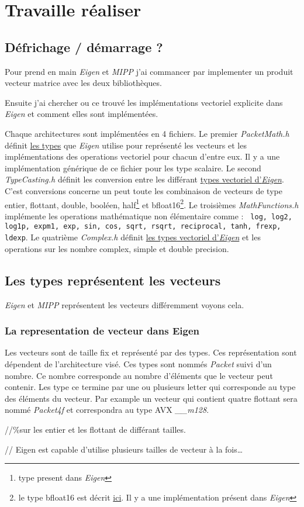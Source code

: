 \section{Travaille réaliser}

\subsection{Défrichage / démarrage ?}

Pour prend en main \emph{Eigen} et \emph{MIPP} j'ai commancer par implementer un produit
vecteur matrice avec les deux bibliothèques.

Ensuite j'ai chercher ou ce trouvé les implémentations vectoriel explicite dans \emph{Eigen}
et comment elles sont implémentées.

Chaque architectures sont implémentées en 4 fichiers. Le premier \emph{PacketMath.h}
définit \hyperref[typeEigen]{les types} que \emph{Eigen} utilise pour représenté les
vecteurs et les implémentations des operations vectoriel pour chacun d'entre eux.
Il y a une implémentation générique de ce fichier pour les type scalaire. Le second
\emph{TypeCasting.h} définit les conversion entre les différant \hyperref[typeEigen]{types
vectoriel d'\emph{Eigen}}. C'est conversions concerne un peut toute les combinaison
de vecteurs de type entier, flottant, double, booléen, half\footnote{type present dans
\emph{Eigen}} et bfloat16\footnote{le type bfloat16 est décrit
\href{https://en.wikipedia.org/wiki/Bfloat16_floating-point_format}{ici}. Il y a une
implémentation présent dans \emph{Eigen}}. Le troisièmes \emph{MathFunctions.h}
implémente les operations mathématique non élémentaire comme : \texttt{ log, log2, log1p,
expm1, exp, sin, cos, sqrt, rsqrt, reciprocal, tanh, frexp, ldexp}. Le quatrième
\emph{Complex.h} définit \hyperref[typeEigen]{les types vectoriel d'\emph{Eigen}} et
les operations sur les nombre complex, simple et double precision.

\subsection{Les types représentent les vecteurs}
\emph{Eigen} et \emph{MIPP} représentent les vecteurs différemment voyons cela.

\label{typeEigen}
\subsubsection{La representation de vecteur dans Eigen}
{
  Les vecteurs sont de taille fix et représenté par des types. Ces représentation sont
  dépendent de l'architecture visé. Ces types sont nommés \emph{Packet} suivi d'un nombre.
  Ce nombre corresponde au nombre d'éléments que le vecteur peut contenir. Les type ce
  termine par une ou plusieurs letter qui corresponde au type des éléments du vecteur.
  Par example un vecteur qui contient quatre flottant sera nommé \emph{Packet4f} et
  correspondra au type AVX \emph{__m128}.

  //\%sur les entier et les flottant de différant tailles.

  // Eigen est capable d'utilise plusieurs tailles de vecteur à la fois\dots
}

